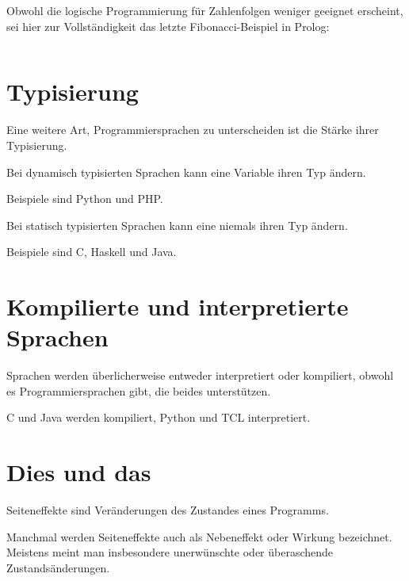 \begin{beispiel}
    Obwohl die logische Programmierung für Zahlenfolgen weniger geeignet erscheint,
    sei hier zur Vollständigkeit das letzte Fibonacci-Beispiel in Prolog:
    \inputminted[numbersep=5pt, tabsize=4]{prolog}{scripts/prolog/fibonacci.pl}
\end{beispiel}

\section{Typisierung}
Eine weitere Art, Programmiersprachen zu unterscheiden ist die Stärke
ihrer Typisierung.

\begin{definition}%
    Bei dynamisch typisierten Sprachen kann eine Variable ihren Typ ändern.
\end{definition}

Beispiele sind Python und PHP.

\begin{definition}%
    Bei statisch typisierten Sprachen kann eine niemals ihren Typ ändern.
\end{definition}

Beispiele sind C, Haskell und Java.

\section{Kompilierte und interpretierte Sprachen}
Sprachen werden überlicherweise entweder interpretiert oder kompiliert,
obwohl es Programmiersprachen gibt, die beides unterstützen.

C und Java werden kompiliert, Python und TCL interpretiert.

\section{Dies und das}
\begin{definition}[Seiteneffekt]%
    Seiteneffekte sind Veränderungen des Zustandes eines Programms.
\end{definition}

Manchmal werden Seiteneffekte auch als Nebeneffekt oder Wirkung bezeichnet.
Meistens meint man insbesondere unerwünschte oder überaschende Zustandsänderungen.

